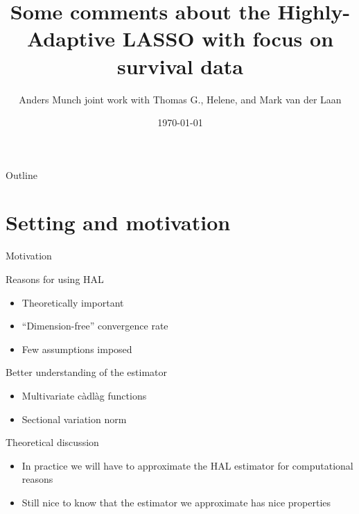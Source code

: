 \documentclass[smaller]{beamer}\usepackage{listings}
\author{Anders Munch \newline \small joint work with Thomas G., Helene, and Mark van der Laan}
\date{\today}
\title{Some comments about the Highly-Adaptive LASSO with focus on survival data}
\begin{document}
\maketitle
\begin{frame}{Outline}
\tableofcontents
\end{frame}

\section{Setting and motivation}
\label{sec:org4797d1c}
\begin{frame}[label={sec:org92f6536}]{Motivation}
\small
\begin{block}{Reasons for using HAL}
\begin{itemize}
\item Theoretically important
\item ``Dimension-free'' convergence rate
\item Few assumptions imposed
\end{itemize}

\pause  
\end{block}

\begin{block}{Better understanding of the estimator}
\begin{itemize}
\item Multivariate càdlàg functions
\item Sectional variation norm
\end{itemize}

\pause
\end{block}

\begin{block}{Theoretical discussion}
\begin{itemize}
\item In practice we will have to approximate the HAL estimator for computational
reasons
\item Still nice to know that the estimator we approximate has  nice properties
\end{itemize}
\end{block}
\end{frame}
\end{document}

